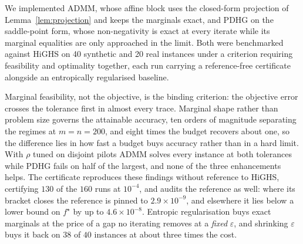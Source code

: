 \documentclass{article}
\newcommand{\Tol}[1]{10^{-#1}}
\begin{document}
We implemented ADMM, whose affine block uses the closed-form projection of
Lemma~\ref{lem:projection} and keeps the marginals exact, and PDHG on the saddle-point form,
whose non-negativity is exact at every iterate while its marginal equalities are only
approached in the limit. Both were benchmarked against HiGHS on 40 synthetic and 20 real
instances under a criterion requiring feasibility and optimality together, each run carrying
a reference-free certificate alongside an entropically regularised baseline.

Marginal feasibility, not the objective, is the binding criterion: the objective error
crosses the tolerance first in almost every trace. Marginal shape rather than problem size
governs the attainable accuracy, ten orders of magnitude separating the regimes at
$m=n=200$, and eight times the budget recovers about one, so the difference lies in how fast
a budget buys accuracy rather than in a hard limit. With $\rho$ tuned on disjoint pilots ADMM
solves every instance at both tolerances while PDHG fails on half of the largest, and none of
the three enhancements helps. The certificate reproduces these findings without reference to
HiGHS, certifying $130$ of the $160$ runs at $\Tol{4}$, and audits the reference as well:
where its bracket closes the reference is pinned to $2.9\times\Tol{9}$, and elsewhere it lies
below a lower bound on $f^\star$ by up to $4.6\times\Tol{8}$. Entropic regularisation buys
exact marginals at the price of a gap no iterating removes at a \emph{fixed} $\varepsilon$,
and shrinking $\varepsilon$ buys it back on $38$ of $40$ instances at about three times the
cost.
\end{document}
